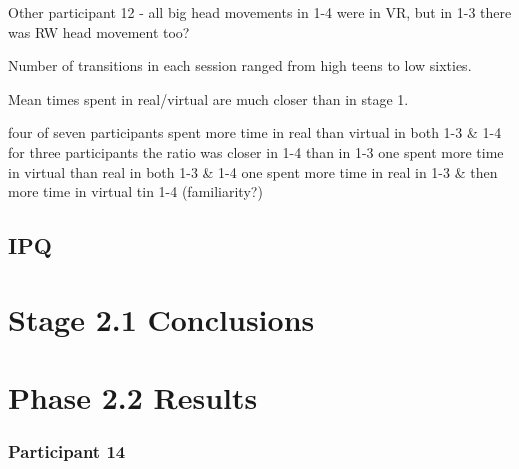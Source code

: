 Other
	participant 12 - all big head movements in 1-4 were in VR, but in 1-3 there was RW head movement too?


Number of transitions in each session ranged from high teens to low sixties.

Mean times spent in real/virtual are much closer than in stage 1.

four of seven participants spent more time in real than virtual in both 1-3 \& 1-4
	for three participants the ratio was closer in 1-4 than in 1-3
	one spent more time in virtual than real in both 1-3 \& 1-4
	one spent more time in real in 1-3 \& then more time in virtual tin 1-4 (familiarity?)


\subsection{IPQ}






\section{Stage 2.1 Conclusions}


\clearpage


\section{Phase 2.2 Results}


\clearpage

\subsubsection{Participant 14}

